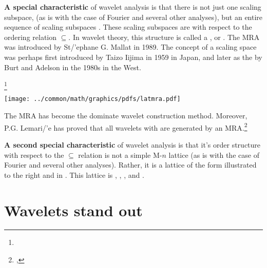 \begin{minipage}{\tw-55mm}%
  \textbf{A special characteristic} of wavelet analysis is that there is not just one scaling subspace,
  (as is with the case of Fourier and several other analyses),
  but an entire sequence of scaling subspaces .
  These scaling subspaces are  with respect to the
  ordering relation $\subseteq$. In wavelet theory, this structure is called a ,
  or .
  The MRA was introduced by St{/'e}phane G. Mallat in 1989.
  The concept of a scaling space was perhaps first introduced by Taizo Iijima in 1959 in Japan,
  and later as the  by Burt and Adelson in the 1980s in the West.\footnotemark
\end{minipage}%
\footnote{%
  }
\hfill%
{\begin{minipage}{50mm}%
  \fns%
  \texttt{[image: ../common/math/graphics/pdfs/latmra.pdf]}%
\end{minipage}}

The MRA has become the dominate wavelet construction method.
Moreover, P.G. Lemari/'e has proved that all wavelets with  are generated by an MRA.\footnote{
  ,
  }

\begin{minipage}{\tw-65mm}%
  \textbf{A second special characteristic} of wavelet analysis is that it's order structure
  with respect to the $\subseteq$ relation is not a simple M-$n$ lattice 
 (as is with the case of Fourier and several other analyses).
  Rather, it is a lattice of the form illustrated to the right and in .
  This lattice is , ,
  , and  .\footnotemark
\end{minipage}%
\hfill%

\section{Wavelets stand out}

